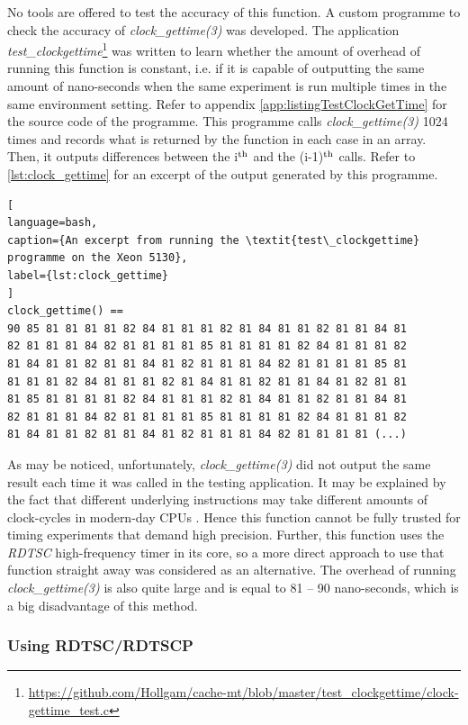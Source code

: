 No tools are offered to test the accuracy of this function. A custom programme to check the accuracy of \textit{clock\_gettime(3)} was developed. The application \textit{test\_clockgettime}\footnote{\url{https://github.com/Hollgam/cache-mt/blob/master/test\_clockgettime/clock-gettime\_test.c}} was written to learn whether the amount of overhead of running this function is constant, i.e. if it is capable of outputting the same amount of nano-seconds when the same experiment is run multiple times in the same environment setting. Refer to appendix \ref{app:listingTestClockGetTime} for the source code of the programme. This programme calls \textit{clock\_gettime(3)} 1024 times and records what is returned by the function in each case in an array. Then, it outputs differences between the i$^{\textnormal{th}}$ and the (i-1)$^{\textnormal{th}}$ calls. Refer to \ref{lst:clock_gettime} for an excerpt of the output generated by this programme.

\begin{lstlisting}[
language=bash,
caption={An excerpt from running the \textit{test\_clockgettime} programme on the Xeon 5130},
label={lst:clock_gettime}
]
clock_gettime() ==
90 85 81 81 81 81 82 84 81 81 81 82 81 84 81 81 82 81 81 84 81
82 81 81 81 84 82 81 81 81 81 85 81 81 81 81 82 84 81 81 81 82
81 84 81 81 82 81 81 84 81 82 81 81 81 84 82 81 81 81 81 85 81
81 81 81 82 84 81 81 81 82 81 84 81 81 82 81 81 84 81 82 81 81
81 85 81 81 81 81 82 84 81 81 81 82 81 84 81 81 82 81 81 84 81
82 81 81 81 84 82 81 81 81 81 85 81 81 81 81 82 84 81 81 81 82
81 84 81 81 82 81 81 84 81 82 81 81 81 84 82 81 81 81 81 (...)
\end{lstlisting}

As may be noticed, unfortunately, \textit{clock\_gettime(3)} did not output the same result each time it was called in the testing application. It may be explained by the fact that different underlying instructions may take different amounts of clock-cycles in modern-day CPUs \cite{Granlund2012}. Hence this function cannot be fully trusted for timing experiments that demand high precision. Further, this function uses the \textit{RDTSC} high-frequency timer in its core, so a more direct approach to use that function straight away was considered as an alternative. The overhead of running \textit{clock\_gettime(3)} is also quite large and is equal to 81 -- 90 nano-seconds, which is a big disadvantage of this method.

\subsubsection{Using RDTSC/RDTSCP}

